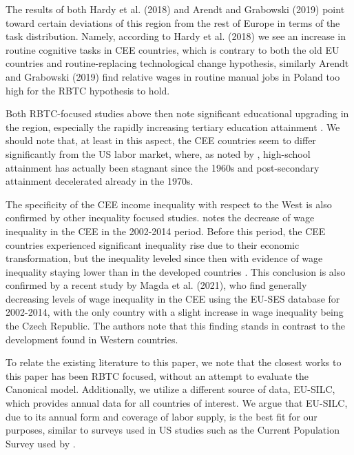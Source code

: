 \documentclass[11pt]{article}
\begin{document}
The results of both Hardy et al. (2018) and Arendt and Grabowski (2019) point toward certain deviations of this region from the rest of Europe in terms of the task distribution. Namely, according to Hardy et al. (2018) we see an increase in routine cognitive tasks in CEE countries, which is contrary to both the old EU countries and routine-replacing technological change hypothesis, similarly Arendt and Grabowski (2019) find relative wages in routine manual jobs in Poland too high for the RBTC hypothesis to hold. 

Both RBTC-focused studies above then note significant educational upgrading in the region, especially the rapidly increasing tertiary education attainment \citep{hardy2018educational}. We should note that, at least in this aspect, the CEE countries seem to differ significantly from the US labor market, where, as noted by \citet{acemoglu2012does}, high-school attainment has actually been stagnant since the 1960s and post-secondary attainment decelerated already in the 1970s.

The specificity of the CEE income inequality with respect to the West is also confirmed by  other inequality focused studies. \citet{magda2021firms} notes the decrease of wage inequality in the CEE in the 2002-2014 period. Before this period, the CEE countries experienced significant inequality rise due to their economic transformation, but the inequality leveled since then \citep{tyrowicz2019wage} with evidence of wage inequality staying lower than in the developed countries \citep{mysikova2018personal}. This conclusion is also confirmed by a recent study by Magda et al. (2021), who find generally decreasing levels of wage inequality in the CEE using the EU-SES database for 2002-2014, with the only country with a slight increase in wage inequality being the Czech Republic. The authors note that this finding stands in contrast to the development found in Western countries.%

To relate the existing literature to this paper, we note that the closest works to this paper has been RBTC focused, without an attempt to evaluate the Canonical model. Additionally, we utilize a different source of data, EU-SILC, which provides annual data for all countries of interest. We argue that EU-SILC, due to its annual form and coverage of labor supply, is the best fit for our purposes, similar to surveys used in US studies such as the Current Population Survey used by \citet{katz1992changes}.
\end{document}
